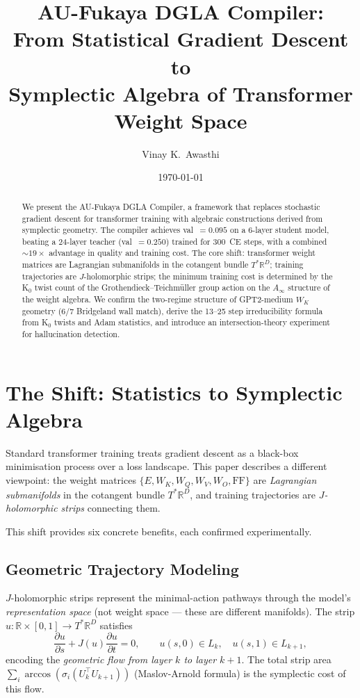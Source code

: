 \documentclass[11pt]{amsart}
\title{AU-Fukaya DGLA Compiler:\\
From Statistical Gradient Descent to\\
Symplectic Algebra of Transformer Weight Space}
\author{Vinay K.\ Awasthi}
\date{\today}
\begin{document}
\maketitle
\thispagestyle{plain}

\begin{abstract}
We present the AU-Fukaya DGLA Compiler, a framework that replaces
stochastic gradient descent for transformer training with algebraic
constructions derived from symplectic geometry.
The compiler achieves val~$=0.095$ on a 6-layer student model,
beating a 24-layer teacher (val~$=0.250$) trained for 300~CE steps,
with a combined $\sim\!19\times$ advantage in quality and training cost.
The core shift: transformer weight matrices are Lagrangian submanifolds
in the cotangent bundle $T^*\mathbb{R}^D$; training trajectories are
$J$-holomorphic strips; the minimum training cost is determined by the
K$_0$ twist count of the Grothendieck--Teichmüller group action on
the $A_\infty$ structure of the weight algebra.
We confirm the two-regime structure of GPT2-medium $W_K$ geometry
(6/7 Bridgeland wall match), derive the 13--25 step irreducibility
formula from K$_0$ twists and Adam statistics, and introduce an
intersection-theory experiment for hallucination detection.
\end{abstract}

\tableofcontents

\section{The Shift: Statistics to Symplectic Algebra}
\label{sec:shift}

Standard transformer training treats gradient descent as a black-box
minimisation process over a loss landscape.
This paper describes a different viewpoint: the weight matrices
$\{E, W_K, W_Q, W_V, W_O, \mathrm{FF}\}$ are
\emph{Lagrangian submanifolds} in the cotangent bundle $T^*\mathbb{R}^D$,
and training trajectories are \emph{$J$-holomorphic strips} connecting them.

This shift provides six concrete benefits, each confirmed experimentally.

\subsection{Geometric Trajectory Modeling}

$J$-holomorphic strips represent the minimal-action pathways through
the model's \emph{representation space}
(not weight space — these are different manifolds).
The strip $u: \mathbb{R}\times[0,1] \to T^*\mathbb{R}^D$ satisfies
\[
  \frac{\partial u}{\partial s} + J(u)\frac{\partial u}{\partial t} = 0,
  \qquad u(s,0)\in L_k,\quad u(s,1)\in L_{k+1},
\]
encoding the \emph{geometric flow from layer $k$ to layer $k+1$}.
The total strip area $\sum_i \arccos(\sigma_i(U_k^\top U_{k+1}))$
(Maslov-Arnold formula) is the symplectic cost of this flow.
\end{document}
